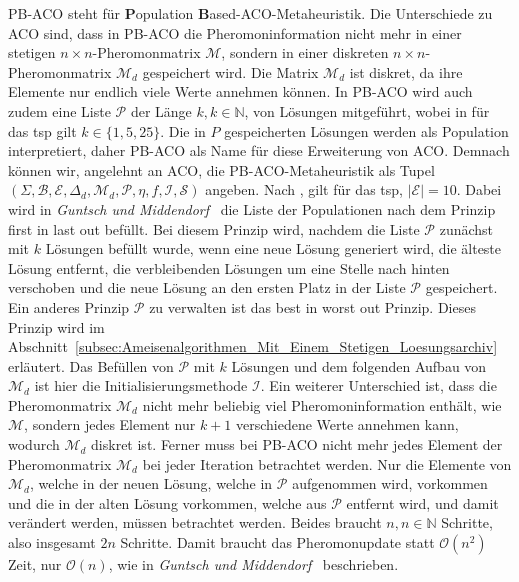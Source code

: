 \documentclass[fontsize=12, a4aper]{scrartcl}
\begin{document}
	PB-ACO steht für \textbf{P}opulation \textbf{B}ased-ACO-Metaheuristik. Die Unterschiede zu ACO sind, dass in PB-ACO die Pheromoninformation nicht mehr in einer stetigen \(n \times n\)-Pheromonmatrix \(\mathcal{M}\), sondern in einer diskreten \(n \times n\)-Pheromonmatrix \(\mathcal{M}_d\) gespeichert wird. Die Matrix \(\mathcal{M}_d\) ist diskret, da ihre Elemente nur endlich viele Werte annehmen können. In PB-ACO wird auch zudem eine Liste \(\mathcal{P}\) der Länge \(k, k \in \mathbb{N}\), von Lösungen mitgeführt, wobei in \cite{guntsch2002population} für das \ac{tsp} gilt \(k \in \{1, 5, 25\}\). Die in \(P\) gespeicherten Lösungen werden als Population interpretiert, daher \glqq PB-ACO\grqq{} als Name für diese Erweiterung von \glqq ACO\grqq. Demnach können wir, angelehnt an ACO, die PB-ACO-Metaheuristik als Tupel \((\Sigma, \mathcal{B}, \mathcal{E}, \Delta_d, \mathcal{M}_d, \mathcal{P}, \eta, f, \mathcal{I}, \mathcal{S})\) angeben. Nach \cite{guntsch2002population}, gilt für das \ac{tsp}, \(|\mathcal{E}| = 10\). Dabei wird in \textit{Guntsch und Middendorf}~\cite{guntsch2002population} die Liste der Populationen nach dem Prinzip \glqq first in last out\grqq{} befüllt. Bei diesem Prinzip wird, nachdem die Liste \(\mathcal{P}\) zunächst mit \(k\) Lösungen befüllt wurde, wenn eine neue Lösung generiert wird, die älteste Lösung entfernt, die verbleibenden Lösungen um eine Stelle nach hinten verschoben und die neue Lösung an den ersten Platz in der Liste \(\mathcal{P}\) gespeichert. Ein anderes Prinzip \(\mathcal{P}\) zu verwalten ist das \glqq best in worst out\grqq{} Prinzip. Dieses Prinzip wird im Abschnitt~\ref{subsec:Ameisenalgorithmen_Mit_Einem_Stetigen_Loesungsarchiv} erläutert. Das Befüllen von \(\mathcal{P}\) mit \(k\) Lösungen und dem folgenden Aufbau von \(\mathcal{M}_d\) ist hier die Initialisierungsmethode \(\mathcal{I}\). Ein weiterer Unterschied ist, dass die Pheromonmatrix \(\mathcal{M}_d\) nicht mehr beliebig viel Pheromoninformation enthält, wie \(\mathcal{M}\), sondern jedes Element nur \(k + 1\) verschiedene Werte annehmen kann, wodurch \(\mathcal{M}_d\) diskret ist. Ferner muss bei PB-ACO nicht mehr jedes Element der Pheromonmatrix \(\mathcal{M}_d\) bei jeder Iteration betrachtet werden. Nur die Elemente von \(\mathcal{M}_d\), welche in der neuen Lösung, welche in \(\mathcal{P}\) aufgenommen wird, vorkommen und die in der alten Lösung vorkommen, welche aus \(\mathcal{P}\) entfernt wird, und damit verändert werden, müssen betrachtet werden. Beides braucht \(n, n \in \mathbb{N}\) Schritte, also insgesamt \(2n\) Schritte. Damit braucht das Pheromonupdate statt \(\mathcal{O}(n^2)\) Zeit, nur \(\mathcal{O}(n)\), wie in \textit{Guntsch und Middendorf}~\cite{guntsch2002population} beschrieben.\hfill\newline
	
\end{document}
